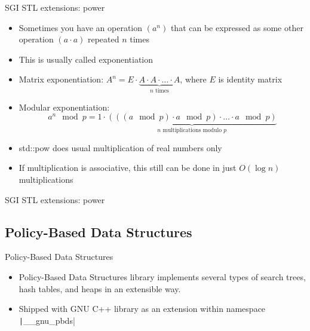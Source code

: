 \documentclass[12pt,presentation,hyperref={unicode},aspectratio=169]{beamer}
\begin{document}
\begin{frame}{SGI STL extensions: power}
  \begin{itemize}
    \item<1-> Sometimes you have an operation $(a^n)$ that can be
      expressed as some other operation $(a \cdot a)$ repeated $n$ times

    \item<1-> This is usually called exponentiation

    \item<2-> Matrix exponentiation:
      $A^n = E
        \cdot \underbrace{A \cdot A \cdot \ldots \cdot A}_{n \text{ times}}$,
        where $E$ is identity matrix

    \item<2-> Modular exponentiation: $$
      a^n \mod{p} = 1
      \cdot \underbrace{(((a \mod{p}) \cdot a \mod{p}) \cdot
      \ldots \cdot a \mod{p})}_{n\text{ multiplications modulo }p}
    $$

    \item<3-> std::pow does usual multiplication of real numbers only

    \item<3-> If multiplication is associative, this still can be done in just
      $O(\log{n})$ multiplications
  \end{itemize}
\end{frame}

\begin{frame}[fragile]{SGI STL extensions: power}
\end{frame}


\subsection{Policy-Based Data Structures}

\begin{frame}[fragile]{Policy-Based Data Structures}
  \begin{itemize}
    \item<1-> Policy-Based Data Structures library implements several types of
      search trees, hash tables, and heaps in an extensible way.
    \item<2-> Shipped with GNU C++ library as an
      extension within namespace
      \texttt|__gnu_pbds|
  \end{itemize}
\end{frame}
\end{document}

